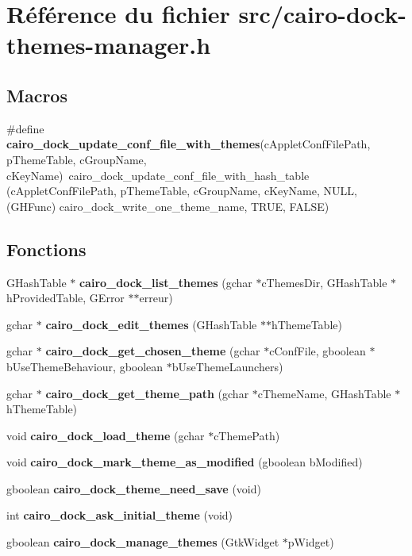 \section{Référence du fichier src/cairo-dock-themes-manager.h}
\label{cairo-dock-themes-manager_8h}
\subsection*{Macros}
\begin{CompactItemize}
\item 
\#define {\bf cairo\_\-dock\_\-update\_\-conf\_\-file\_\-with\_\-themes}(cAppletConfFilePath, pThemeTable, cGroupName, cKeyName)~cairo\_\-dock\_\-update\_\-conf\_\-file\_\-with\_\-hash\_\-table (cAppletConfFilePath, pThemeTable, cGroupName, cKeyName, NULL, (GHFunc) cairo\_\-dock\_\-write\_\-one\_\-theme\_\-name, TRUE, FALSE)
\end{CompactItemize}
\subsection*{Fonctions}
\begin{CompactItemize}
\item 
GHashTable $\ast$ {\bf cairo\_\-dock\_\-list\_\-themes} (gchar $\ast$cThemesDir, GHashTable $\ast$hProvidedTable, GError $\ast$$\ast$erreur)
\item 
gchar $\ast$ {\bf cairo\_\-dock\_\-edit\_\-themes} (GHashTable $\ast$$\ast$hThemeTable)
\item 
gchar $\ast$ {\bf cairo\_\-dock\_\-get\_\-chosen\_\-theme} (gchar $\ast$cConfFile, gboolean $\ast$bUseThemeBehaviour, gboolean $\ast$bUseThemeLaunchers)
\item 
gchar $\ast$ {\bf cairo\_\-dock\_\-get\_\-theme\_\-path} (gchar $\ast$cThemeName, GHashTable $\ast$hThemeTable)
\item 
void {\bf cairo\_\-dock\_\-load\_\-theme} (gchar $\ast$cThemePath)
\item 
void {\bf cairo\_\-dock\_\-mark\_\-theme\_\-as\_\-modified} (gboolean bModified)
\item 
gboolean {\bf cairo\_\-dock\_\-theme\_\-need\_\-save} (void)
\item 
int {\bf cairo\_\-dock\_\-ask\_\-initial\_\-theme} (void)
\item 
gboolean {\bf cairo\_\-dock\_\-manage\_\-themes} (GtkWidget $\ast$pWidget)
\end{CompactItemize}


